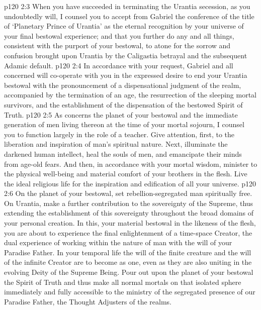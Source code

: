 \pc \vs p120 2:3 \bibnobreakspace When you have succeeded in terminating the Urantia secession, as you undoubtedly will, I counsel you to accept from Gabriel the conference of the title of ‘Planetary Prince of Urantia’ as the eternal recognition by your universe of your final bestowal experience; and that you further do any and all things, consistent with the purport of your bestowal, to atone for the sorrow and confusion brought upon Urantia by the Caligastia betrayal and the subsequent Adamic default.
\pc \vs p120 2:4 \bibnobreakspace In accordance with your request, Gabriel and all concerned will co\hyp{}operate with you in the expressed desire to end your Urantia bestowal with the pronouncement of a dispensational judgment of the realm, accompanied by the termination of an age, the resurrection of the sleeping mortal survivors, and the establishment of the dispensation of the bestowed Spirit of Truth.
\pc \vs p120 2:5 \bibnobreakspace As concerns the planet of your bestowal and the immediate generation of men living thereon at the time of your mortal sojourn, I counsel you to function largely in the role of a teacher. Give attention, first, to the liberation and inspiration of man’s spiritual nature. Next, illuminate the darkened human intellect, heal the souls of men, and emancipate their minds from age\hyp{}old fears. And then, in accordance with your mortal wisdom, minister to the physical well\hyp{}being and material comfort of your brothers in the flesh. Live the ideal religious life for the inspiration and edification of all your universe.
\pc \vs p120 2:6 \bibnobreakspace On the planet of your bestowal, set rebellion\hyp{}segregated man spiritually free. On Urantia, make a further contribution to the sovereignty of the Supreme, thus extending the establishment of this sovereignty throughout the broad domains of your personal creation. In this, your material bestowal in the likeness of the flesh, you are about to experience the final enlightenment of a time\hyp{}space Creator, the dual experience of working within the nature of man with the will of your Paradise Father. In your temporal life the will of the finite creature and the will of the infinite Creator are to become as one, even as they are also uniting in the evolving Deity of the Supreme Being. Pour out upon the planet of your bestowal the Spirit of Truth and thus make all normal mortals on that isolated sphere immediately and fully accessible to the ministry of the segregated presence of our Paradise Father, the Thought Adjusters of the realms.
